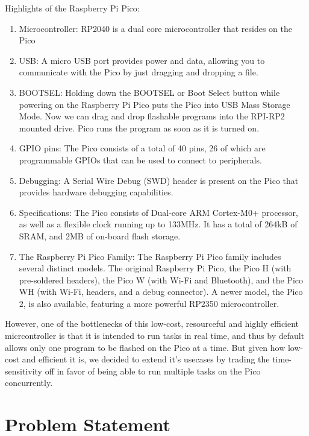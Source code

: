\documentclass[12pt]{report}
\begin{document}
Highlights of the Raspberry Pi Pico:
\begin{enumerate}


\item Microcontroller: RP2040 is a dual core microcontroller that resides on the Pico


\item USB: A micro USB port provides power and data, allowing you to communicate
with the Pico by just dragging and dropping a file.

\item BOOTSEL: Holding down the BOOTSEL or Boot Select button while powering
on the Raspberry Pi Pico puts the Pico into USB Mass Storage Mode. Now we can
drag and drop flashable programs into the RPI-RP2 mounted drive.
Pico runs the program as soon as it is turned on.

\item GPIO pins: The Pico consists of a total of 40 pins, 26 of which are
programmable GPIOs that can be used to connect to peripherals.

\item Debugging: A Serial Wire Debug (SWD) header is present on the Pico
that provides hardware debugging capabilities. 

\item Specifications: The Pico consists of Dual-core ARM Cortex-M0+ processor,
as well as a flexible clock running up to 133MHz. It has a total of 264kB
of SRAM, and 2MB of on-board flash storage.

\item The Raspberry Pi Pico Family: The Raspberry Pi Pico family includes
several distinct models. The original Raspberry Pi Pico, the Pico H 
(with pre-soldered headers), the Pico W (with Wi-Fi and Bluetooth),
and the Pico WH (with Wi-Fi, headers, and a debug connector).
A newer model, the Pico 2, is also available, featuring a more powerful
RP2350 microcontroller.

\end{enumerate}

However, one of the bottlenecks of this low-cost, resourceful and highly efficient
micrcontroller is that it is intended to run tasks in real time, and thus
by default allows only one program to be flashed on the Pico at a time. 
But given how low-cost and efficient it is, we decided to extend it's usecases
by trading the time-sensitivity off in favor of being able to run multiple tasks
on the Pico concurrently.

\section{Problem Statement}
\end{document}
